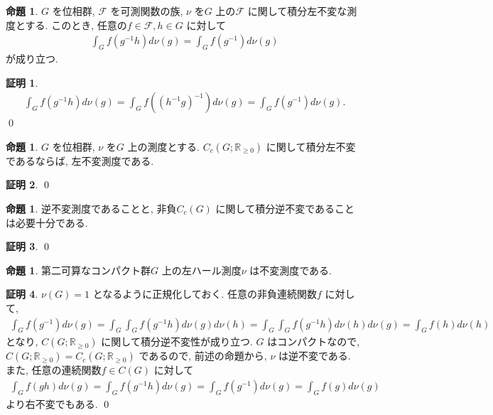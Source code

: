 \documentclass[10pt, fleqn, label-section=none]{bxjsarticle}
\theoremstyle{definition}
\newtheorem{prop}[dfn]{命題}
\newtheorem*{pf*}{証明}
\renewcommand{\;}{\, ; \,}
\begin{document}
\begin{prop} $G$ を位相群, $\mathcal F$ を可測関数の族, $\nu$ を$G$ 上の$\mathcal F$ に関して積分左不変な測度とする. このとき, 任意の$f \in \mathcal F, h \in G$ に対して
\begin{align*} \int_G f(g^{-1} h)d\nu(g) = \int_{G} f(g^{-1}) d\nu(g)  \end{align*}
が成り立つ. 
\end{prop}
\begin{pf*}
\begin{align*} \int_G f(g^{-1} h)d\nu(g) =\int_G f((h^{-1} g)^{-1} ) d\nu(g) = \int_{G} f(g^{-1}) d\nu(g).  \end{align*}
\qed
\end{pf*}

\begin{prop}$G$ を位相群, $\nu$ を$G$ 上の測度とする. $C_c (G; \mathbb R_{\geq 0})$ に関して積分左不変であるならば, 左不変測度である.

\end{prop}
\begin{pf*}

\qed
\end{pf*}


\begin{prop}逆不変測度であることと, 非負$C_c(G)$ に関して積分逆不変であることは必要十分である.

\end{prop}
\begin{pf*}

\qed
\end{pf*}



\begin{prop}第二可算なコンパクト群$G$ 上の左ハール測度$\nu$ は不変測度である.
\end{prop}
\begin{pf*}$\nu(G) = 1$ となるように正規化しておく.  任意の非負連続関数$f$ に対して, 
\begin{align*} \int_G f(g^{-1}) d\nu(g) = \int_G \int_G f(g^{-1} h) d\nu(g) d\nu(h)
 = \int_G \int_G f(g^{-1} h) d\nu(h) d\nu(g) = \int_G f(h) d\nu(h)  \end{align*}
 となり, $C(G; \mathbb R_{\geq 0}) $ に関して積分逆不変性が成り立つ. $G$ はコンパクトなので, $C(G; \mathbb R_{\geq 0}) = C_c (G; \mathbb R_{\geq 0})$ であるので, 前述の命題から, $\nu$ は逆不変である. また, 任意の連続関数$f \in C(G)$ に対して
 \begin{align*}  \int_G f(gh) d\nu (g) = \int_G f(g^{-1}h) d\nu(g) = \int_G f(g^{-1}) d\nu(g) =  \int_G f(g) d\nu(g) \end{align*}
 より右不変でもある.
\qed
\end{pf*}
\end{document}
